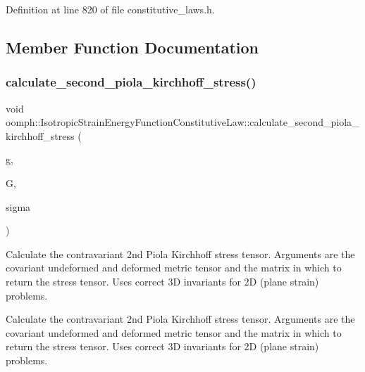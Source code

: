 Definition at line 820 of file constitutive\+\_\+laws.\+h.



\subsection{Member Function Documentation}
\mbox{\label{classoomph_1_1IsotropicStrainEnergyFunctionConstitutiveLaw_af6c25617b8be6cc454d6b526ec6121fc}} 
\subsubsection{\texorpdfstring{calculate\+\_\+second\+\_\+piola\+\_\+kirchhoff\+\_\+stress()}{calculate\_second\_piola\_kirchhoff\_stress()}\hspace{0.1cm}{\footnotesize\ttfamily [1/3]}}
{\footnotesize\ttfamily void oomph\+::\+Isotropic\+Strain\+Energy\+Function\+Constitutive\+Law\+::calculate\+\_\+second\+\_\+piola\+\_\+kirchhoff\+\_\+stress (\begin{DoxyParamCaption}\item[{const \hyperlink{classoomph_1_1DenseMatrix}{Dense\+Matrix}$<$ double $>$ \&}]{g,  }\item[{const \hyperlink{classoomph_1_1DenseMatrix}{Dense\+Matrix}$<$ double $>$ \&}]{G,  }\item[{\hyperlink{classoomph_1_1DenseMatrix}{Dense\+Matrix}$<$ double $>$ \&}]{sigma }\end{DoxyParamCaption})\hspace{0.3cm}{\ttfamily [virtual]}}



Calculate the contravariant 2nd Piola Kirchhoff stress tensor. Arguments are the covariant undeformed and deformed metric tensor and the matrix in which to return the stress tensor. Uses correct 3D invariants for 2D (plane strain) problems. 

Calculate the contravariant 2nd Piola Kirchhoff stress tensor. Arguments are the covariant undeformed and deformed metric tensor and the matrix in which to return the stress tensor. Uses correct 3D invariants for 2D (plane strain) problems. 

